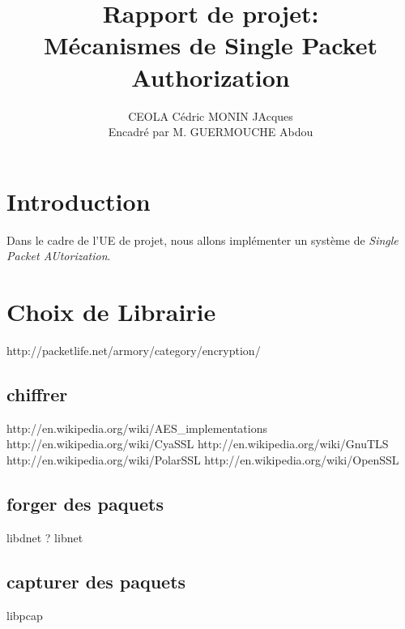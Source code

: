 \documentclass[12pt]{article}
\title{Rapport de projet:\\
Mécanismes de Single Packet Authorization}
\author{CEOLA Cédric MONIN JAcques\\
Encadré par M. GUERMOUCHE Abdou}
\begin{document}
\maketitle

\clearpage                  
\tableofcontents
\clearpage

\section{Introduction}
Dans le cadre de l'UE de projet, nous allons implémenter un système de \emph{Single Packet AUtorization}.

\section{Choix de Librairie}

http://packetlife.net/armory/category/encryption/

\subsection{chiffrer}
http://en.wikipedia.org/wiki/AES_implementations
http://en.wikipedia.org/wiki/CyaSSL
http://en.wikipedia.org/wiki/GnuTLS
http://en.wikipedia.org/wiki/PolarSSL
http://en.wikipedia.org/wiki/OpenSSL

\subsection{forger des paquets}
libdnet ?
libnet

\subsection{capturer des paquets}
libpcap
\end{document}
